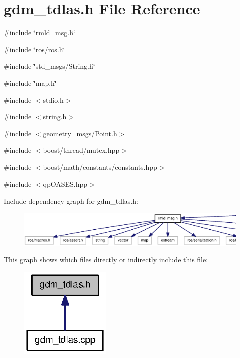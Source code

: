 \section{gdm\_\-tdlas.h File Reference}
\label{gdm__tdlas_8h}
{\ttfamily \#include \char`\"{}rmld\_\-msg.h\char`\"{}}\par
{\ttfamily \#include \char`\"{}ros/ros.h\char`\"{}}\par
{\ttfamily \#include \char`\"{}std\_\-msgs/String.h\char`\"{}}\par
{\ttfamily \#include \char`\"{}map.h\char`\"{}}\par
{\ttfamily \#include $<$stdio.h$>$}\par
{\ttfamily \#include $<$string.h$>$}\par
{\ttfamily \#include $<$geometry\_\-msgs/Point.h$>$}\par
{\ttfamily \#include $<$boost/thread/mutex.hpp$>$}\par
{\ttfamily \#include $<$boost/math/constants/constants.hpp$>$}\par
{\ttfamily \#include $<$qpOASES.hpp$>$}\par
Include dependency graph for gdm\_\-tdlas.h:
\nopagebreak
\begin{figure}[H]
\begin{center}
\leavevmode
\includegraphics[width=400pt]{gdm__tdlas_8h__incl}
\end{center}
\end{figure}
This graph shows which files directly or indirectly include this file:
\nopagebreak
\begin{figure}[H]
\begin{center}
\leavevmode
\includegraphics[width=124pt]{gdm__tdlas_8h__dep__incl}
\end{center}
\end{figure}
